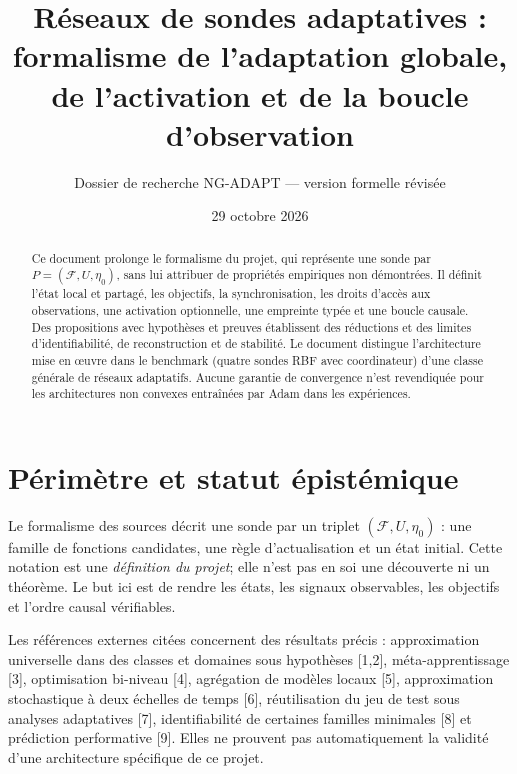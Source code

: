 \documentclass[11pt,a4paper]{article}
\title{Réseaux de sondes adaptatives : formalisme de l'adaptation globale, de l'activation et de la boucle d'observation}
\author{Dossier de recherche NG-ADAPT --- version formelle révisée}
\date{29 octobre 2026}
\begin{document}
\maketitle
\begin{abstract}
Ce document prolonge le formalisme du projet, qui représente une sonde par $P=(\mathcal F,U,\eta_0)$, sans lui attribuer de propriétés empiriques non démontrées. Il définit l'état local et partagé, les objectifs, la synchronisation, les droits d'accès aux observations, une activation optionnelle, une empreinte typée et une boucle causale. Des propositions avec hypothèses et preuves établissent des réductions et des limites d'identifiabilité, de reconstruction et de stabilité. Le document distingue l'architecture mise en œuvre dans le benchmark (quatre sondes RBF avec coordinateur) d'une classe générale de réseaux adaptatifs. Aucune garantie de convergence n'est revendiquée pour les architectures non convexes entraînées par Adam dans les expériences.
\end{abstract}
\tableofcontents
\section{Périmètre et statut épistémique}

Le formalisme des sources décrit une sonde par un triplet $(\mathcal F,U,\eta_0)$ : une famille de fonctions candidates, une règle d'actualisation et un état initial. Cette notation est une \emph{définition du projet}; elle n'est pas en soi une découverte ni un théorème. Le but ici est de rendre les états, les signaux observables, les objectifs et l'ordre causal vérifiables.

Les références externes citées concernent des résultats précis : approximation universelle dans des classes et domaines sous hypothèses [1,2], méta-apprentissage [3], optimisation bi-niveau [4], agrégation de modèles locaux [5], approximation stochastique à deux échelles de temps [6], réutilisation du jeu de test sous analyses adaptatives [7], identifiabilité de certaines familles minimales [8] et prédiction performative [9]. Elles ne prouvent pas automatiquement la validité d'une architecture spécifique de ce projet.
\end{document}
